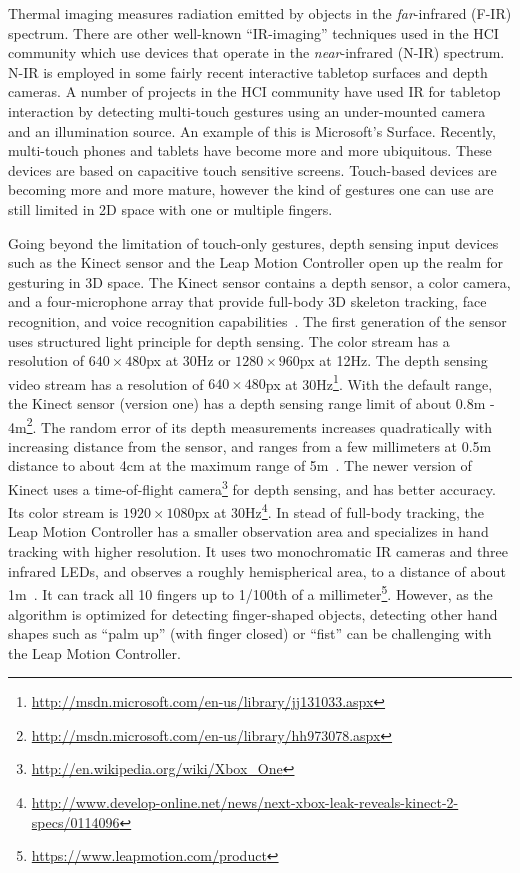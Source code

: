 Thermal imaging measures radiation emitted by objects in the
\textit{far}-infrared (F-IR) spectrum. There are other well-known ``IR-imaging''
techniques used in the HCI community which use devices that operate in the \textit{near}-infrared (N-IR) spectrum.
N-IR is employed in some fairly recent interactive tabletop surfaces and depth
cameras. A number of projects in the HCI community have used IR for tabletop
interaction by detecting multi-touch gestures using an under-mounted
camera and an illumination source. An example of this is Microsoft's 
Surface. Recently, multi-touch phones and tablets have become more and more ubiquitous. These devices
are based on capacitive touch sensitive screens. Touch-based devices are
becoming more and more mature, however the kind of gestures one can use are still
limited in 2D space with one or multiple
fingers. 

Going beyond the limitation of touch-only gestures, 
depth sensing input devices such as the Kinect sensor and the Leap Motion
Controller open up the realm for gesturing in 3D space. The Kinect sensor
contains a depth sensor, a color camera, and a four-microphone array that
provide full-body 3D skeleton tracking, face recognition, and voice
recognition capabilities~\cite{zhang12}. The first generation of the sensor
uses structured light principle for depth sensing.
The color stream has a resolution of $640\times
480$px at 30Hz or $1280\times960$px at 12Hz.  The depth sensing video stream has a resolution of $640\times 480$px at
30Hz\footnote{\url{http://msdn.microsoft.com/en-us/library/jj131033.aspx}}. 
With the default range, the Kinect sensor (version one) has a depth sensing
range limit of about 0.8m -
4m\footnote{\url{http://msdn.microsoft.com/en-us/library/hh973078.aspx}}.
The random error of its depth measurements increases quadratically with
increasing distance from the sensor, and ranges from a few millimeters at 0.5m
distance to about 4cm at the maximum range of 5m~\cite{khoshelham2011}. The newer version of Kinect
uses a time-of-flight
camera\footnote{\url{http://en.wikipedia.org/wiki/Xbox_One}} for depth sensing,
and has better accuracy. Its color stream is $1920\times 1080$px at
30Hz\footnote{\url{http://www.develop-online.net/news/next-xbox-leak-reveals-kinect-2-specs/0114096}}.
In stead of full-body tracking, the Leap Motion Controller has a smaller observation area and specializes in hand tracking with higher
resolution.
It uses two monochromatic IR cameras and three infrared LEDs, and observes a
roughly hemispherical area, to a distance of about 1m~\cite{leapmotion14}. It
can track all 10 fingers up to 1/100th of a
millimeter\footnote{\url{https://www.leapmotion.com/product}}. However, as
the algorithm is optimized for detecting finger-shaped objects, detecting other
hand shapes such as ``palm up'' (with finger closed) or ``fist'' can be
challenging with the Leap Motion Controller.

